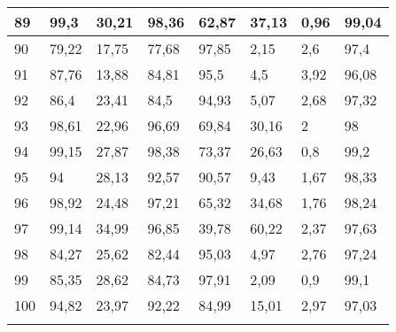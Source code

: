 \begin{longtable}[c]{|l|l|l|l|l|l|l|l|}
89              & 99,3         & 30,21        & 98,36       & 62,87         & 37,13         & 0,96          & 99,04         \\ \hline
90              & 79,22        & 17,75        & 77,68       & 97,85         & 2,15          & 2,6           & 97,4          \\ \hline
91              & 87,76        & 13,88        & 84,81       & 95,5          & 4,5           & 3,92          & 96,08         \\ \hline
92              & 86,4         & 23,41        & 84,5        & 94,93         & 5,07          & 2,68          & 97,32         \\ \hline
93              & 98,61        & 22,96        & 96,69       & 69,84         & 30,16         & 2             & 98            \\ \hline
94              & 99,15        & 27,87        & 98,38       & 73,37         & 26,63         & 0,8           & 99,2          \\ \hline
95              & 94           & 28,13        & 92,57       & 90,57         & 9,43          & 1,67          & 98,33         \\ \hline
96              & 98,92        & 24,48        & 97,21       & 65,32         & 34,68         & 1,76          & 98,24         \\ \hline
97              & 99,14        & 34,99        & 96,85       & 39,78         & 60,22         & 2,37          & 97,63         \\ \hline
98              & 84,27        & 25,62        & 82,44       & 95,03         & 4,97          & 2,76          & 97,24         \\ \hline
99              & 85,35        & 28,62        & 84,73       & 97,91         & 2,09          & 0,9           & 99,1          \\ \hline
100             & 94,82        & 23,97        & 92,22       & 84,99         & 15,01         & 2,97          & 97,03         \\ \hline
\label{anx:lexrgb}
\end{longtable}
